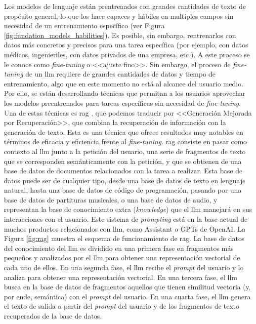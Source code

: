 Los modelos de lenguaje están prentrenados con grandes cantidades de texto de propósito general, lo que los hace capaces y hábiles en multiples campos sin necesidad de un entrenamiento específico (ver Figura \ref{fig:fundation_models_habilities}). Es posible, sin embargo, rentrenarlos con datos más concretos y precisos para una tarea específica (por ejemplo, con datos médicos, ingenieriles, con datos privados de una empresa, etc.). A este proceso se le conoce como \textit{fine-tuning} o <<ajuste fino>>. Sin embargo, el proceso de \textit{fine-tuning} de un \gls{llm} requiere de grandes cantidades de datos y tiempo de entrenamiento, algo que en este momento no está al alcance del usuario medio. Por ello, se están desarrollando técnicas que permitan a los usuarios aprovechar los modelos preentrenados para tareas específicas sin necesidad de \textit{fine-tuning}. Una de estas técnicas es \gls{rag} \citep{WhatRetrievalaugmentedGeneration2021}, que podemos traducir por <<Generación Mejorada por Recuperación>>, que combina la recuperación de información con la generación de texto. Esta es una técnica que ofrece resultados muy notables en términos de eficacia y eficiencia frente al \textit{fine-tuning}. \gls{rag} consiste en pasar como contexto al \gls{llm} junto a la petición del usuario, una serie de fragmentos de texto que se corresponden semánticamente con la petición, y que se obtienen de una base de datos de documentos relacionados con la tarea a realizar. Esta base de datos puede ser de cualquier tipo, desde una base de datos de texto en lenguaje natural, hasta una base de datos de código de programación, pasando por una base de datos de partituras musicales, o una base de datos de audio, y representan la base de conocimiento extra (\textit{knowledge}) que el \gls{llm} manejará en sus interacciones con el usuario. Este sistema de \textit{prompting} está en la base actual de muchos productos relacionados con \gls{llm}, como Assistant o GPTs de OpenAI. La Figura \ref{fig:rag} muestra el esquema de funcionamiento de \gls{rag}. La base de datos del conocimiento del \gls{llm} es dividido en una primera fase en fragmentos más pequeños y analizados por el \gls{llm} para obtener una representación vectorial de cada uno de ellos. En una segunda fase, el \gls{llm} recibe el \textit{prompt} del usuario y lo analiza para obtener una representación vectorial. En una tercera fase, el \gls{llm} busca en la base de datos de fragmentos aquellos que tienen similitud vectoria (y, por ende, semántica) con el \textit{prompt} del usuario. En una cuarta fase, el \gls{llm} genera el texto de salida a partir del \textit{prompt} del usuario y de los fragmentos de texto recuperados de la base de datos. 



